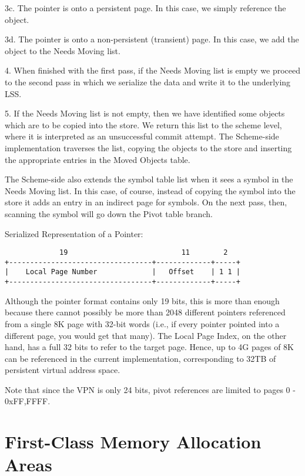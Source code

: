 \documentclass[10pt,letterpaper]{article}
\begin{document}
3c. The pointer is onto a persistent page.  In this case, we simply
    reference the object.


3d. The pointer is onto a non-persistent (transient) page.  In this
    case, we add the object to the Needs Moving list.

4. When finished with the first pass, if the Needs Moving list is
   empty we proceed to the second pass in which we serialize the
   data and write it to the underlying LSS.

5. If the Needs Moving list is not empty, then we have identified
   some objects which are to be copied into the store.  We return
   this list to the scheme level, where it is interpreted as an
   unsuccessful commit attempt.  The Scheme-side implementation
   traverses the list, copying the objects to the store and inserting
   the appropriate entries in the Moved Objects table.

   The Scheme-side also extends the symbol table list when it sees a
   symbol in the Needs Moving list.  In this case, of course, instead
   of copying the symbol into the store it adds an entry in an
   indirect page for symbols.  On the next pass, then, scanning the
   symbol will go down the Pivot table branch.


Serialized Representation of a Pointer:

\begin{verbatim}
             19                           11        2
+----------------------------------+-------------+-----+
|    Local Page Number             |   Offset    | 1 1 |
+----------------------------------+-------------+-----+
\end{verbatim}

Although the pointer format contains only 19 bits, this is more than
enough because there cannot possibly be more than 2048 different pointers
referenced from a single 8K page with 32-bit words (i.e., if every
pointer pointed into a different page, you would get that many).
The Local Page Index, on the other hand, has a full 32 bits to refer
to the target page.  Hence, up to 4G pages of 8K can be referenced
in the current implementation, corresponding to 32TB of persistent
virtual address space.



Note that since the VPN is only 24 bits, pivot references are limited
to pages 0 - 0xFF,FFFF.


\section{First-Class Memory Allocation Areas}
\end{document}
